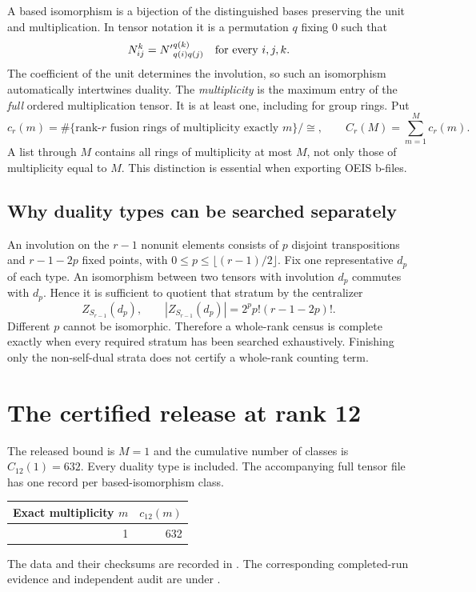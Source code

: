 \documentclass[11pt,a4paper]{article}
\theoremstyle{definition}\newtheorem{definition}[theorem]{Definition}\newtheorem{remark}[theorem]{Remark}
\newcommand{\Rank}{12}
\begin{document}
A based isomorphism is a bijection of the distinguished bases preserving the
unit and multiplication. In tensor notation it is a permutation $q$ fixing $0$
such that
\[
 N_{ij}^{k}={N'}_{q(i)q(j)}^{q(k)}\quad\hbox{for every }i,j,k.
\]
The coefficient of the unit determines the involution, so such an isomorphism
automatically intertwines duality. The \emph{multiplicity} is the maximum entry
of the \emph{full} ordered multiplication tensor. It is at least one, including
for group rings. Put
\[
 c_r(m)=\#\{\text{rank-}r\text{ fusion rings of multiplicity exactly }m\}/\cong,
 \qquad C_r(M)=\sum_{m=1}^{M}c_r(m).
\]
A list through $M$ contains all rings of multiplicity at most $M$, not only
those of multiplicity equal to $M$. This distinction is essential when exporting
OEIS b-files.

\subsection{Why duality types can be searched separately}
An involution on the $r-1$ nonunit elements consists of $p$ disjoint transpositions
and $r-1-2p$ fixed points, with $0\leq p\leq\lfloor(r-1)/2\rfloor$. Fix one
representative $d_p$ of each type. An isomorphism between two tensors with
involution $d_p$ commutes with $d_p$. Hence it is sufficient to quotient that
stratum by the centralizer
\[
 Z_{S_{r-1}}(d_p),\qquad |Z_{S_{r-1}}(d_p)|=2^p p!(r-1-2p)!.
\]
Different $p$ cannot be isomorphic. Therefore a whole-rank census is complete
exactly when every required stratum has been searched exhaustively. Finishing
only the non-self-dual strata does not certify a whole-rank counting term.
\section{The certified release at rank 12}
The released bound is $M=1$ and the cumulative number of classes is $C_{12}(1)=632$. Every duality type is included. The accompanying full tensor file has one record per based-isomorphism class.


\begin{center}\begin{tabular}{rr}\toprule Exact multiplicity $m$ & $c_{\Rank}(m)$\\\midrule
1 & 632\\
\bottomrule\end{tabular}\end{center}

The data and their checksums are recorded in . The corresponding completed-run evidence and independent audit are under .
\end{document}
